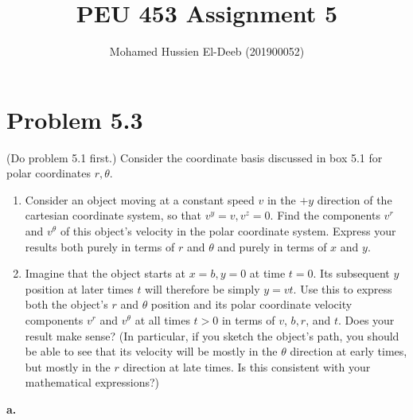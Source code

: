 \documentclass[12pt]{article}
\title{PEU 453 Assignment 5}
\author{Mohamed Hussien El-Deeb (201900052)}
\date{}
\begin{document}
\maketitle
\tableofcontents

\renewcommand{\labelenumi}{\textbf{\alph{enumi}.}}

\newpage

\section{Problem 5.3}

 (Do problem 5.1 first.) Consider the coordinate basis discussed in box 5.1 for polar coordinates \(r, \theta \).

\begin{enumerate}
      \item Consider an object moving at a constant speed \(v\) in the \(+y\) direction of the cartesian coordinate system, so that \(v^y=v, v^z=0\). Find the components \(v^r\) and \(v^\theta \) of this object's velocity in the polar coordinate system. Express your results both purely in terms of \(r\) and \(\theta \) and purely in terms of \(x\) and \(y\).
      \item Imagine that the object starts at \(x=b, y=0\) at time \(t=0\). Its subsequent \(y\) position at later times \(t\) will therefore be simply \(y=v t\). Use this to express both the object's \(r\) and \(\theta \) position and its polar coordinate velocity components \(v^r\) and \(v^\theta \) at all times \(t>0\) in terms of \(v\), \(b, r\), and \(t\). Does your result make sense? (In particular, if you sketch the object's path, you should be able to see that its velocity will be mostly in the \(\theta \) direction at early times, but mostly in the \(r\) direction at late times. Is this consistent with your mathematical expressions?)
\end{enumerate}

\textbf{a.}
\end{document}
